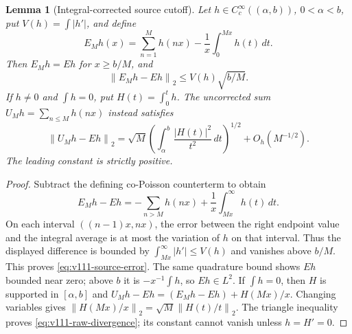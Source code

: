 \documentclass[11pt]{article}
\newtheorem{lemma}[theorem]{Lemma}
\theoremstyle{remark}
\newcommand{\norm}[1]{\left\lVert #1\right\rVert}
\begin{document}
\begin{lemma}[Integral-corrected source cutoff]\label{lem:v111-cutoff}
Let $h\in C_c^\infty((\alpha,b))$, $0<\alpha<b$, put
$V(h)=\int|h'|$, and define
\[
 E_Mh(x)=\sum_{n=1}^M h(nx)-\frac1x\int_0^{Mx}h(t)\,dt.
\]
Then $E_Mh=Eh$ for $x\ge b/M$, and
\begin{equation}\label{eq:v111-source-error}
 \norm{E_Mh-Eh}_2\le V(h)\sqrt{b/M}.
\end{equation}
If $h\ne0$ and $\int h=0$, put $H(t)=\int_0^t h$.
The uncorrected sum $U_Mh=\sum_{n\le M}h(nx)$ instead satisfies
\begin{equation}\label{eq:v111-raw-divergence}
 \norm{U_Mh-Eh}_2
 =\sqrt M\left(\int_\alpha^b\frac{|H(t)|^2}{t^2}\,dt\right)^{1/2}
       +O_h(M^{-1/2}).
\end{equation}
The leading constant is strictly positive.
\end{lemma}
\begin{proof}
Subtract the defining co-Poisson counterterm to obtain
\[
 E_Mh-Eh=-\sum_{n>M}h(nx)+\frac1x\int_{Mx}^\infty h(t)\,dt.
\]
On each interval $((n-1)x,nx)$, the error between the right endpoint
value and the integral average is at most the variation of $h$ on that
interval. Thus the displayed difference is bounded by
$\int_{Mx}^\infty|h'|\le V(h)$ and vanishes above $b/M$.
This proves \eqref{eq:v111-source-error}. The same quadrature bound
shows $Eh$ bounded near zero; above $b$ it is $-x^{-1}\int h$, so
$Eh\in L^2$. If $\int h=0$, then $H$ is supported in $[\alpha,b]$ and
$U_Mh-Eh=(E_Mh-Eh)+H(Mx)/x$.
Changing variables gives
$\norm{H(Mx)/x}_2=\sqrt M\norm{H(t)/t}_2$.
The triangle inequality proves \eqref{eq:v111-raw-divergence}; its
constant cannot vanish unless $h=H'=0$.
\end{proof}
\end{document}
